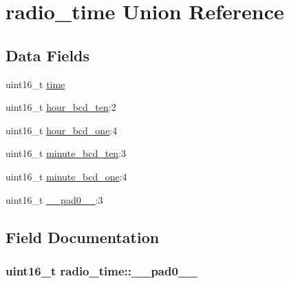 \hypertarget{unionradio__time}{}\section{radio\+\_\+time Union Reference}
\label{unionradio__time}
\subsection*{Data Fields}
\begin{DoxyCompactItemize}
\item 
uint16\+\_\+t \hyperlink{unionradio__time_a93c85fe59e0b9ea2664f2e0a25e3b515}{time}
\item 
uint16\+\_\+t \hyperlink{unionradio__time_a173314f920dc7461b836e23a4c4ca08c}{hour\+\_\+bcd\+\_\+ten}\+:2
\item 
uint16\+\_\+t \hyperlink{unionradio__time_a3fd6ebeb948fd8fbef351e02d5a86d63}{hour\+\_\+bcd\+\_\+one}\+:4
\item 
uint16\+\_\+t \hyperlink{unionradio__time_aca5d8063e116f489ae3b1fb0637c44de}{minute\+\_\+bcd\+\_\+ten}\+:3
\item 
uint16\+\_\+t \hyperlink{unionradio__time_aade9aa30034abe099a0e8d0d9813d2ac}{minute\+\_\+bcd\+\_\+one}\+:4
\item 
uint16\+\_\+t \hyperlink{unionradio__time_a41265b29d8d8e96ac08039f43bf1e6ff}{\+\_\+\+\_\+pad0\+\_\+\+\_\+}\+:3
\end{DoxyCompactItemize}


\subsection{Field Documentation}
\hypertarget{unionradio__time_a41265b29d8d8e96ac08039f43bf1e6ff}{}
\subsubsection[{\+\_\+\+\_\+pad0\+\_\+\+\_\+}]{\setlength{\rightskip}{0pt plus 5cm}uint16\+\_\+t radio\+\_\+time\+::\+\_\+\+\_\+pad0\+\_\+\+\_\+}\label{unionradio__time_a41265b29d8d8e96ac08039f43bf1e6ff}
\hypertarget{unionradio__time_a3fd6ebeb948fd8fbef351e02d5a86d63}{}
